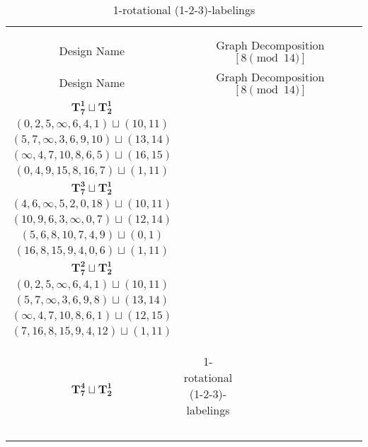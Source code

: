 \documentclass{article}
\begin{document}
    \begin{longtable}{|c|c|}
        \hline
        \caption{1- rotational (1-2-3)-labelings}\\
        \endfoot
        
        \hline
        \caption{1-rotational (1-2-3)-labelings}\\
        \endlastfoot
        \hline
        Design Name & Graph Decomposition $[8\pmod{14}]$ \\
        \hline
        \endfirsthead
        \hline
        Design Name & Graph Decomposition $[8\pmod{14}]$ \\
        \hline
        \endhead
        $\mathbf{T_{7}^{1}} \sqcup \mathbf{T_{2}^{1}}$ & \begin{tabular}{c}
        $(0,1,\infty,2,4,5,3)\sqcup(12,15)$ \\ 
        $(0,2,5,\infty,6,4,1)\sqcup(10,11)$ \\ 
        $(5,7,\infty,3,6,9,10)\sqcup(13,14)$ \\ 
        $(\infty,4,7,10,8,6,5)\sqcup(16,15)$ \\ 
        $(0,4,9,15,8,16,7)\sqcup(1,11)$
        \end{tabular} \\ 
        \hline
        $\mathbf{T_{7}^{3}} \sqcup \mathbf{T_{2}^{1}}$ & \begin{tabular}{c}
        $(3,5,4,2,\infty,8,1)\sqcup(12,15)$ \\ 
        $(4,6,\infty,5,2,0,18)\sqcup(10,11)$ \\ 
        $(10,9,6,3,\infty,0,7)\sqcup(12,14)$ \\ 
        $(5,6,8,10,7,4,9)\sqcup(0,1)$ \\ 
        $(16,8,15,9,4,0,6)\sqcup(1,11)$
        \end{tabular} \\ 
        \hline
        $\mathbf{T_{7}^{2}} \sqcup \mathbf{T_{2}^{1}}$ & \begin{tabular}{c}
        $(3,5,4,2,\infty,1,6)\sqcup(9,10)$ \\ 
        $(0,2,5,\infty,6,4,1)\sqcup(10,11)$ \\ 
        $(5,7,\infty,3,6,9,8)\sqcup(13,14)$ \\ 
        $(\infty,4,7,10,8,6,1)\sqcup(12,15)$ \\ 
        $(7,16,8,15,9,4,12)\sqcup(1,11)$
        \end{tabular} \\ 
        \hline
        $\mathbf{T_{7}^{4}} \sqcup \mathbf{T_{2}^{1}}$ & \begin{tabular}{c}

\end{tabular}
\end{longtable}
\end{document}
